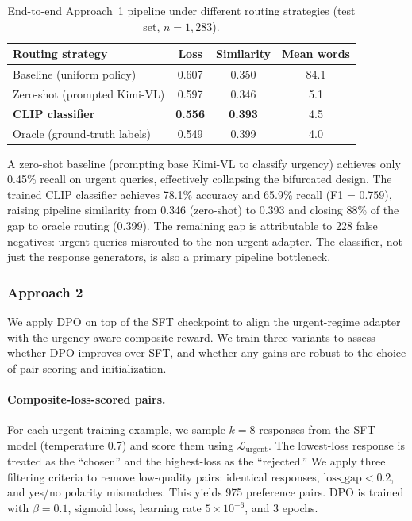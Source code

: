 \documentclass{article}
\begin{document}
\begin{table}[H]
\centering
\caption{End-to-end Approach~1 pipeline under different routing strategies (test set, $n = 1{,}283$).}
\label{tab:pipeline}
\begin{tabular}{lccc}
\toprule
\textbf{Routing strategy} & \textbf{Loss} & \textbf{Similarity} & \textbf{Mean words} \\
\midrule
Baseline (uniform policy)        & 0.607 & 0.350 & 84.1 \\
Zero-shot (prompted Kimi-VL)     & 0.597 & 0.346 &  5.1 \\
\textbf{CLIP classifier}        & \textbf{0.556} & \textbf{0.393} &  4.5 \\
Oracle (ground-truth labels)     & 0.549 & 0.399 &  4.0 \\
\bottomrule
\end{tabular}
\end{table}

A zero-shot baseline (prompting base Kimi-VL to classify urgency) achieves only 0.45\% recall on urgent queries, effectively collapsing the bifurcated design. The trained CLIP classifier achieves 78.1\% accuracy and 65.9\% recall (F1 = 0.759), raising pipeline similarity from 0.346 (zero-shot) to 0.393 and closing 88\% of the gap to oracle routing (0.399). The remaining gap is attributable to 228 false negatives: urgent queries misrouted to the non-urgent adapter. The classifier, not just the response generators, is also a primary pipeline bottleneck.

\subsubsection{Approach 2}\label{sec:dpo_approach2}
We apply DPO \cite{rafailov2023dpo} on top of the SFT checkpoint to align the urgent-regime adapter with the urgency-aware composite reward. We train three variants to assess whether DPO improves over SFT, and whether any gains are robust to the choice of pair scoring and initialization.

\paragraph{Composite-loss-scored pairs.}
For each urgent training example, we sample $k = 8$ responses from the SFT model (temperature 0.7) and score them using $\mathcal{L}_{\text{urgent}}$. The lowest-loss response is treated as the ``chosen'' and the highest-loss as the ``rejected.'' We apply three filtering criteria to remove low-quality pairs: identical responses, $\text{loss\_gap} < 0.2$, and yes/no polarity mismatches. This yields 975 preference pairs. DPO is trained with $\beta = 0.1$, sigmoid loss, learning rate $5 \times 10^{-6}$, and 3 epochs.
\end{document}
